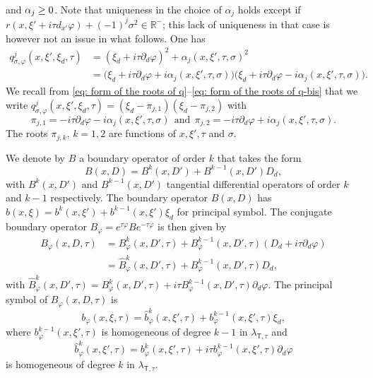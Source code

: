 \documentclass[JEP,XML,SOM,Unicode,published]{cedram}
\theoremstyle{plain}
\theoremstyle{definition}
\def\R{\mathbb{R}}
\let \Re \relax
\DeclareMathOperator{\Re}{Re}
\newcommand{\lsct}{\lambda_{{\scriptscriptstyle{\mathsf T}},\tau}}
\newcommand{\qconj}{q_{\sigma,\varphi}}
\begin{document}
and $\Re \alpha_j \geq 0$. Note that uniqueness in the choice of
$\alpha_j$ holds except if $r(x, \xi' + i \tau d_{x'}\varphi)
+ (-1)^j \sigma^2 \in \R^-$; this lack of uniqueness in that case is however not an issue
in what follows.
One has
\begin{align*}
\qconj^j(x,\xi',\xi_d,\tau)
&= (\xi_d+i\tau\partial_d\varphi)^2+\alpha_j (x,\xi',\tau,\sigma)^2\\
&=
\big(\xi_d+i\tau\partial_d\varphi+i\alpha_j(x,\xi',\tau,\sigma)\big)%
\big(\xi_d+i\tau\partial_d\varphi-i\alpha_j(x,\xi',\tau,\sigma)\big).
\end{align*}
We recall from \eqref{eq: form of the roots of q}--\eqref{eq: form of the
roots of q-bis} that we write $\qconj^j(x,\xi',\xi_d,\tau)=(\xi_d-\pi_{j,1})(\xi_d-\pi_{j,2})$ with
\begin{equation*}
\pi_{j,1}=-i\tau\partial_d\varphi- i\alpha_j(x,\xi',\tau,\sigma)
\ \ \text{and} \ \
\pi_{j,2} = -i\tau\partial_d\varphi + i\alpha_j(x,\xi',\tau,\sigma).
\end{equation*}
The roots $\pi_{j,k}$, $k=1,2$ are functions of $x,\xi',\tau$ and $\sigma$.

We denote by $B$ a boundary operator of order $k$ that takes
the form
\[
B(x,D)=B^{k}(x,D') + B^{k-1}(x,D')D_d,
\]
with $B^{k}(x,D')$
and $B^{k-1}(x,D')$ tangential differential operators of order $k$ and
$k-1$ respectively. The boundary operator $B(x,D)$ has
$b(x,\xi)=b^k(x,\xi') + b^{k-1}(x,\xi')\xi_d$ for principal
symbol. The conjugate boundary operator
$B_{\varphi}=e^{\tau\varphi}Be^{-\tau\varphi}$ is then given by
\begin{align*}
B_{\varphi}(x,D,\tau) &=B^k_{\varphi}(x, D',\tau)+B^{k-1}_{\varphi}(x,D',\tau)(D_d+i\tau\partial_d\varphi)\\
&=
\hat{B}^k_{\varphi}(x,D',\tau)+
B^{k-1}_{\varphi}(x,D',\tau)D_d,
\end{align*}
with
$\hat{B}^k_{\varphi}(x,D',\tau)
=B^k_{\varphi}(x,D',\tau)+i \tau
B^{k-1}_{\varphi}(x,D',\tau)\partial_d\varphi$.
The principal symbol of $B_{\varphi}(x,D,\tau)$ is
\begin{equation*}
b_\varphi(x,\xi,\tau) = \hat{b}^k_{\varphi}(x,\xi',\tau) + b^{k-1}_{\varphi}(x,\xi',\tau) \xi_d,
\end{equation*}
where $b^{k-1}_{\varphi}(x,\xi',\tau)$ is homogeneous of
degree $k-1$ in $\lsct$ and
\[
\hat{b}^k_{\varphi}(x,\xi',\tau)=b^k_{\varphi}(x,\xi',\tau)+ i \tau
b^{k-1}_{\varphi}(x,\xi',\tau)\partial_d\varphi
\]
is homogeneous of
degree $k$ in $\lsct$.
\end{document}
